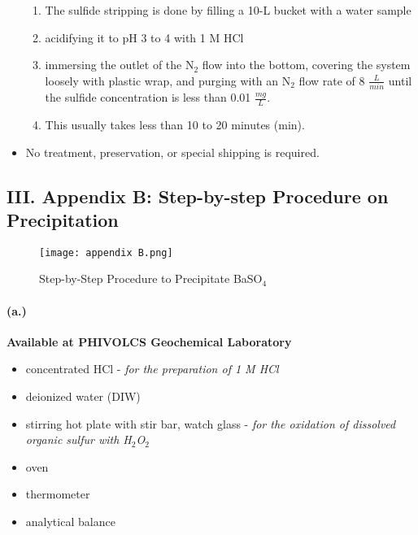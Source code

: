 \documentclass[a4paper,twoside,11pt]{article}
\begin{document}
\begin{itemize}
    \begin{enumerate}
        \item The sulfide stripping is done by filling a 10-L bucket with a water sample
        \item acidifying it to pH 3 to 4 with 1 M HCl
        \item immersing the outlet of the \color{red}N$_2$ \color{black}flow into the bottom, covering the system loosely with plastic wrap, and purging with an \color{red}N$_2$ \color{black}flow rate of 8 $\frac{L}{min}$ until the sulfide concentration is less than 0.01 $\frac{mg}{L}$. 
        \item This usually takes less than 10 to 20 minutes (min).
    \end{enumerate}
    \item No treatment, preservation, or special shipping is required.
\end{itemize}

\subsection*{III. Appendix B: Step-by-step Procedure on \hypertarget{thesentence2}{Precipitation}}

\begin{figure}[h]
\centering
\texttt{[image: appendix B.png]}
\caption{Step-by-Step Procedure to Precipitate BaSO$_4$}
\label{fig:figure2}
\end{figure}

\paragraph{(a.)} \textbf{Available at PHIVOLCS Geochemical Laboratory}
\begin{itemize}
    \item concentrated HCl - \textit{for the preparation of 1 M HCl}
    \item deionized water (DIW)
    \item stirring hot plate with stir bar, watch glass - \textit{for the oxidation of dissolved organic sulfur with H$_2$O$_2$}
    \item oven
    \item thermometer
    \item analytical balance
\end{itemize}
\end{document}
